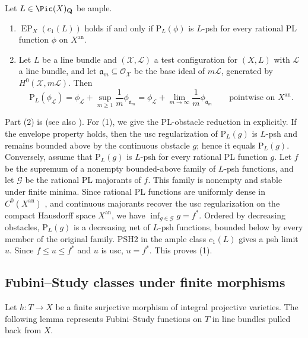\documentclass[11pt,a4paper]{article}
\newcommand{\an}{\mathrm{an}}          %
\newcommand{\EP}{\operatorname{EP}}
\begin{document}
\begin{proposition}\label{prop:ample-envelopes}
Let $L\in\Pic(X)_{\mathbf Q}$ be ample.
\begin{enumerate}
\item $\EP_X(c_1(L))$ holds if and only if $\mathrm P_L(\phi)$ is $L$-psh for every rational PL function $\phi$ on $X^{\an}$.
\item Let $L$ be a line bundle and $(\mathcal X,\mathcal L)$ a test configuration for $(X,L)$ with $\mathcal L$ a line bundle, and let $\mathfrak a_m\subseteq\mathcal O_{\mathcal X}$ be the base ideal of $m\mathcal L$, generated by $H^0(\mathcal X,m\mathcal L)$. Then
\[
\mathrm P_L(\phi_{\mathcal L})=\phi_{\mathcal L}+\sup_{m\ge1}\frac1m\phi_{\mathfrak a_m}=\phi_{\mathcal L}+\lim_{m\to\infty}\frac1m\phi_{\mathfrak a_m}\qquad\text{pointwise on }X^{\an}.
\]
\end{enumerate}
\end{proposition}

Part (2) is \cite[Lemma~5.22]{BJ22} (see also \cite[Lemmas~1.5 and~1.6]{BJaddendum}). For (1), we give the PL-obstacle reduction in \cite[Lemma~1.3]{BJaddendum} explicitly. If the envelope property holds, then the usc regularization of $\mathrm P_L(g)$ is $L$-psh and remains bounded above by the continuous obstacle $g$; hence it equals $\mathrm P_L(g)$. Conversely, assume that $\mathrm P_L(g)$ is $L$-psh for every rational PL function $g$. Let $f$ be the supremum of a nonempty bounded-above family of $L$-psh functions, and let $\mathcal G$ be the rational PL majorants of $f$. This family is nonempty and stable under finite minima. Since rational PL functions are uniformly dense in $C^0(X^{\an})$ \cite[Theorem~2.2]{BJ22}, and continuous majorants recover the usc regularization on the compact Hausdorff space $X^{\an}$, we have $\inf_{g\in\mathcal G}g=f^*$. Ordered by decreasing obstacles, $\mathrm P_L(g)$ is a decreasing net of $L$-psh functions, bounded below by every member of the original family. PSH2 in the ample class $c_1(L)$ gives a psh limit $u$. Since $f\le u\le f^*$ and $u$ is usc, $u=f^*$. This proves (1).

\subsection{Fubini--Study classes under finite morphisms}
\label{subsec:prelim-finite-classes}

Let $h\colon T\to X$ be a finite surjective morphism of integral projective varieties. The following lemma represents Fubini--Study functions on $T$ in line bundles pulled back from $X$.
\end{document}
